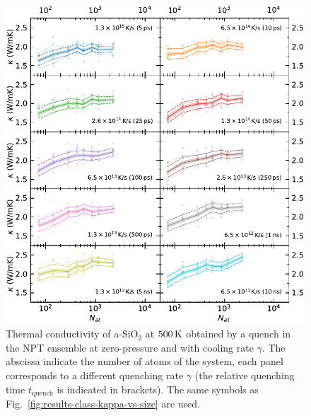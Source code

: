 \vspace{-1cm}
\begin{figure}[!htb]
    \centering
    \includegraphics[width=\textwidth]{chapters/appendix/figures/Silica_NPT_kappa_NATconv.pdf}
    \caption{Thermal conductivity of a-SiO$_2$ at $500\,\mathrm{K}$ obtained by a quench in the NPT ensemble at zero-pressure and with cooling rate $\gamma$. 
    The abscissa indicate the number of atoms of the system, each panel corresponds to a different quenching rate $\gamma$ (the relative quenching time $t_\mathrm{quench}$ is indicated in brackets). 
    The same symbols as Fig.~\ref{fig:results-class-kappa-vs-size} are used.
    }
    \label{fig:appendix-silica-class-npt-kappa-vs-size}
\end{figure}

